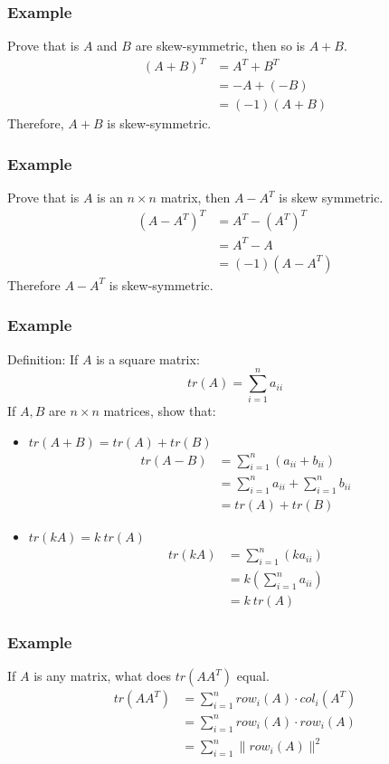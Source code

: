 \documentclass[letterpaper, 12pt]{math}
\begin{document}
\subsubsection*{Example}
Prove that is \( A \) and \( B \) are skew-symmetric, then so is \( A+B \).
\begin{align*}
  (A+B)^T &= A^T+B^T \\
  &= -A+(-B) \\
  &= (-1)(A+B)
\end{align*}
Therefore, \( A+B \) is skew-symmetric.

\subsubsection*{Example}
Prove that is \( A \) is an \( n\times n \) matrix, then \( A-A^T \) is skew
symmetric.
\begin{align*}
  (A-A^T)^T &= A^T-(A^T)^T \\
  &= A^T-A \\
  &= (-1)(A-A^T)
\end{align*}
Therefore \( A-A^T \) is skew-symmetric.

\subsubsection*{Example}
Definition: If \( A \) is a square matrix:
\[ tr(A) = \sum_{i=1}^{n}a_{ii} \]
If \( A,B \) are \( n\times n \) matrices, show that:
\begin{itemize}
  \item \( tr(A+B) = tr(A)+tr(B) \)
  \begin{align*}
    tr(A-B) &= \sum_{i=1}^{n}(a_{ii}+b_{ii}) \\
    &= \sum_{i=1}^{n}a_{ii}+\sum_{i=1}^{n}b_{ii} \\
    &= tr(A)+tr(B)
  \end{align*}
  \item \( tr(kA) = k~tr(A) \)
  \begin{align*}
    tr(kA) &= \sum_{i=1}^{n}(ka_{ii}) \\
    &= k\left(\sum_{i=1}^{n}a_{ii}\right) \\
    &= k~tr(A)
  \end{align*}
\end{itemize}

\subsubsection*{Example}
If \( A \) is any matrix, what does \( tr(AA^T) \) equal.
\begin{align*}
  tr(AA^T) &= \sum_{i=1}^{n}row_i(A)\cdot col_i(A^T) \\
  &= \sum_{i=1}^{n}row_i(A)\cdot row_i(A) \\
  &= \sum_{i=1}^{n}\|row_i(A)\|^2
\end{align*}
\end{document}
